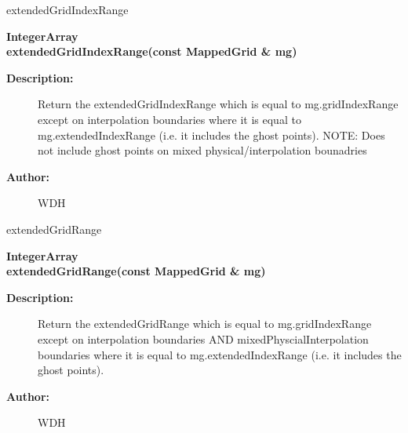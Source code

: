 extendedGridIndexRange
 
\begin{flushleft} \textbf{%
IntegerArray \\ 
\settowidth{\OGgetIndexIncludeArgIndent}{extendedGridIndexRange(}%
extendedGridIndexRange(const MappedGrid \& mg)
}\end{flushleft}
\begin{description}
\item[{\bf Description:}] 
   Return the extendedGridIndexRange which is equal to mg.gridIndexRange except on
  interpolation boundaries where it is equal to mg.extendedIndexRange (i.e. it includes
  the ghost points). NOTE: Does not include ghost points on mixed physical/interpolation bounadries
\item[{\bf Author:}]  WDH
\end{description}
extendedGridRange
 
\begin{flushleft} \textbf{%
IntegerArray \\ 
\settowidth{\OGgetIndexIncludeArgIndent}{extendedGridRange(}%
extendedGridRange(const MappedGrid \& mg)
}\end{flushleft}
\begin{description}
\item[{\bf Description:}] 
   Return the extendedGridRange which is equal to mg.gridIndexRange except on
  interpolation boundaries AND mixedPhyscialInterpolation boundaries
  where it is equal to mg.extendedIndexRange (i.e. it includes
  the ghost points). 
\item[{\bf Author:}]  WDH
\end{description}
